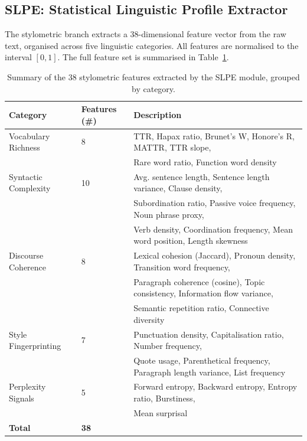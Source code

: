 \subsection{SLPE: Statistical Linguistic Profile Extractor}

\label{sec:slpe}

The stylometric branch extracts a 38-dimensional feature vector from the raw text, organised across
five linguistic categories. All features are normalised to the interval $[0, 1]$. The full feature
set is summarised in Table~\ref{tab:stylometric_features}.

\begin{table}[t]
\caption{Summary of the 38 stylometric features extracted by the SLPE module, grouped by category.}
\label{tab:stylometric_features}
\begin{tabular}{lll}
\toprule
\textbf{Category} & \textbf{Features (\#)} & \textbf{Description} \\
\midrule
Vocabulary Richness   & 8 & TTR, Hapax ratio, Brunet's W, Honore's R, MATTR, TTR slope, \\
                      &   & Rare word ratio, Function word density \\
Syntactic Complexity  & 10 & Avg. sentence length, Sentence length variance, Clause density, \\
                      &    & Subordination ratio, Passive voice frequency, Noun phrase proxy, \\
                      &    & Verb density, Coordination frequency, Mean word position, Length skewness \\
Discourse Coherence   & 8 & Lexical cohesion (Jaccard), Pronoun density, Transition word frequency, \\
                      &   & Paragraph coherence (cosine), Topic consistency, Information flow variance, \\
                      &   & Semantic repetition ratio, Connective diversity \\
Style Fingerprinting  & 7 & Punctuation density, Capitalisation ratio, Number frequency, \\
                      &   & Quote usage, Parenthetical frequency, Paragraph length variance, List frequency \\
Perplexity Signals    & 5 & Forward entropy, Backward entropy, Entropy ratio, Burstiness, \\
                      &   & Mean surprisal \\
\midrule
\textbf{Total} & \textbf{38} & \\
\bottomrule
\end{tabular}
\end{table}

